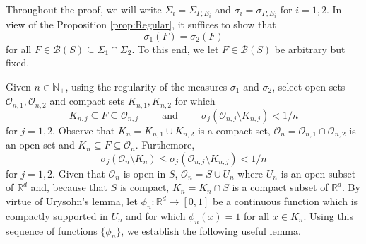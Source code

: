 \documentclass[smallextended]{svjour3}
\theoremstyle{remark}
\renewenvironment{proof}[1][\proofname]{\renewcommand\xproofname{#1}\xproof}{\endxproof}
\begin{document}
\begin{proof}
Throughout the proof, we will write $\Sigma_i=\Sigma_{P,E_i}$ and $\sigma_i=\sigma_{P,E_i}$ for $i=1,2$. In view of the Proposition \ref{prop:Regular}, it suffices to show that 
\begin{equation*}
\sigma_1(F)=\sigma_2(F)
\end{equation*}
for all $F\in \mathcal{B}(S)\subseteq \Sigma_{1}\cap\Sigma_{2}$. To this end, we let $F\in\mathcal{B}(S)$ be arbitrary but fixed. 

Given $n\in\mathbb{N}_+$, using the regularity of the measures $\sigma_1$ and $\sigma_2$, select open sets $\mathcal{O}_{n,1},\mathcal{O}_{n,2}$ and compact sets $K_{n,1},K_{n,2}$ for which
\begin{equation*}
K_{n,j}\subseteq F\subseteq \mathcal{O}_{n,j}\hspace{1cm}\mbox{and}\hspace{1cm}\sigma_j(\mathcal{O}_{n,j}\setminus K_{n,j})<1/n
\end{equation*}
for $j=1,2$. Observe that $K_n=K_{n,1}\cup K_{n,2}$ is a compact set, $\mathcal{O}_n=\mathcal{O}_{n,1}\cap\mathcal{O}_{n,2}$ is an open set and $K_n\subseteq F\subseteq \mathcal{O}_n$. Furthemore, 
\begin{equation*}
\sigma_j(\mathcal{O}_n\setminus K_n)\leq \sigma_j(\mathcal{O}_{n,j}\setminus K_{n,j})<1/n
\end{equation*}
for $j=1,2$. Given that $\mathcal{O}_n$ is open in $S$, $\mathcal{O}_n=S\cup U_n$ where $U_n$ is an open subset of $\mathbb{R}^d$ and, because that $S$ is compact, $K_n=K_n\cap S$ is a compact subset of $\mathbb{R}^d$. By virtue of Urysohn's lemma, let $\phi_n:\mathbb{R}^d\to [0,1]$ be a continuous function which is compactly supported in $U_n$ and for which $\phi_n(x)=1$ for all $x\in K_n$. Using this sequence of functions $\{\phi_n\}$, we establish the following useful lemma.


\end{proof}
\end{document}
